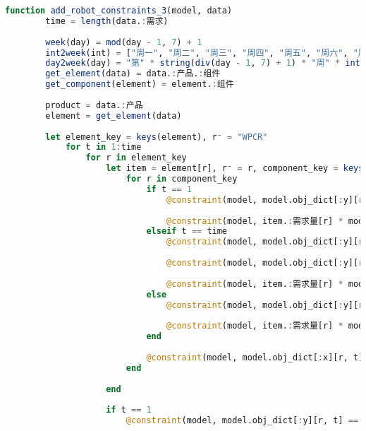 \begin{appendices}
\begin{lstlisting}[language=julia]
    function add_robot_constraints_3(model, data)
        time = length(data.:需求)
    
        week(day) = mod(day - 1, 7) + 1
        int2week(int) = ["周一", "周二", "周三", "周四", "周五", "周六", "周日"][week(int)]
        day2week(day) = "第" * string(div(day - 1, 7) + 1) * "周" * int2week(day)
        get_element(data) = data.:产品.:组件
        get_component(element) = element.:组件
    
        product = data.:产品
        element = get_element(data)
    
        let element_key = keys(element), r⁻ = "WPCR"
            for t in 1:time
                for r in element_key
                    let item = element[r], r⁻ = r, component_key = keys(item.:组件)
                        for r in component_key
                            if t == 1
                                @constraint(model, model.obj_dict[:y][r, t] == 0 + model.obj_dict[:x][r, t] - item.:需求量[r] * model.obj_dict[:x][r⁻, t])
    
                                @constraint(model, item.:需求量[r] * model.obj_dict[:x][r⁻, t] <= 0)
                            elseif t == time
                                @constraint(model, model.obj_dict[:y][r, t] == model.obj_dict[:y][r, t-1] + model.obj_dict[:x][r, t] - item.:需求量[r] * model.obj_dict[:x][r⁻, t])
    
                                @constraint(model, model.obj_dict[:y][r, t] == 0)
    
                                @constraint(model, item.:需求量[r] * model.obj_dict[:x][r⁻, t] <= model.obj_dict[:y][r, t-1])
                            else
                                @constraint(model, model.obj_dict[:y][r, t] == model.obj_dict[:y][r, t-1] + model.obj_dict[:x][r, t] - item.:需求量[r] * model.obj_dict[:x][r⁻, t])
    
                                @constraint(model, item.:需求量[r] * model.obj_dict[:x][r⁻, t] <= model.obj_dict[:y][r, t-1])
                            end
    
                            @constraint(model, model.obj_dict[:x][r, t] == model.obj_dict[:x][r, t] * model.obj_dict[:ω][r, t])
                        end
    
                    end
    
                    if t == 1
                        @constraint(model, model.obj_dict[:y][r, t] == 0 + model.obj_dict[:x][r, t] - product.:需求量[r] * model.obj_dict[:x][r⁻, t])
    

\end{lstlisting}
\end{appendices}
